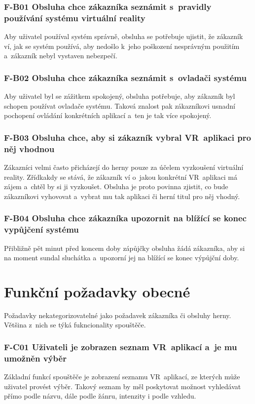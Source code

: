 \subsubsection*{F-B01 Obsluha chce zákazníka seznámit s~pravidly používání
systému virtuální reality}
Aby uživatel používal systém správně, obsluha se potřebuje ujistit, že
zákazník ví, jak se systém používá, aby nedošlo k~jeho poškození
nesprávným použitím a~zákazník nebyl vystaven nebezpečí.

\subsubsection*{F-B02 Obsluha chce zákazníka seznámit s~ovladači systému}
Aby uživatel byl se zážitkem spokojený, obsluha potřebuje, aby zákazník
byl schopen používat ovladače systému. Taková znalost pak zákazníkovi
usnadní pochopení ovládání konkrétních aplikací a~ten je tak více
spokojený.

\subsubsection*{F-B03 Obsluha chce, aby si zákazník vybral VR~aplikaci pro něj
vhodnou}
Zákazníci velmi často přicházejí do herny pouze za účelem vyzkoušení
virtuální reality. Zřídkakdy se stává, že zákazník ví o~jakou
konkrétní VR~aplikaci má zájem a~chtěl by si ji vyzkoušet. Obsluha je proto
povinna zjistit, co bude zákazníkovi vyhovovat a~vybrat mu tak 
aplikaci či herní titul pro něj vhodný.

\subsubsection*{F-B04 Obsluha chce zákazníka upozornit na blížící se konec
vypůjčení systému}
Přibližně pět minut před koncem doby zápůjčky obsluha žádá zákazníka,
aby si na moment sundal sluchátka a~upozorní jej na blížící se konec výpůjční doby.

\newpage

\section{Funkční požadavky
obecné}\label{funkux10dnuxed-poux17eadavky-obecnuxe9}

Požadavky nekategorizovatelné jako požadavek zákazníka či obsluhy
herny. Většina z~nich se týká fukncionality spouštěče.

\subsubsection*{F-C01 Uživateli je zobrazen seznam VR~aplikací a~je mu umožněn
výběr}
Základní funkcí spouštěče je zobrazení seznamu VR~aplikací, ze kterých
může uživatel provést výběr. Takový seznam by měl poskytovat možnost
vyhledávat přímo podle názvu, dále podle žánru, intenzity i podle
vzhledu.

